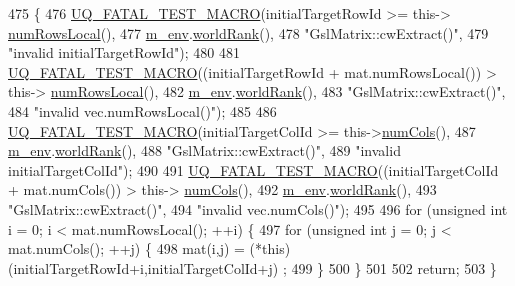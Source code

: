 \begin{DoxyCode}
475 \{
476   \hyperlink{_defines_8h_a56d63d18d0a6d45757de47fcc06f574d}{UQ\_FATAL\_TEST\_MACRO}(initialTargetRowId >= this->
      \hyperlink{class_q_u_e_s_o_1_1_gsl_matrix_ab5ec937a9fd439eef1a87e12c0dbccb4}{numRowsLocal}(),
477                       \hyperlink{class_q_u_e_s_o_1_1_matrix_a247fb0fc0b87fecdee054bb4660b68e8}{m\_env}.\hyperlink{class_q_u_e_s_o_1_1_base_environment_a78b57112bbd0e6dd0e8afec00b40ffa7}{worldRank}(),
478                       \textcolor{stringliteral}{"GslMatrix::cwExtract()"},
479                       \textcolor{stringliteral}{"invalid initialTargetRowId"});
480 
481   \hyperlink{_defines_8h_a56d63d18d0a6d45757de47fcc06f574d}{UQ\_FATAL\_TEST\_MACRO}((initialTargetRowId + mat.numRowsLocal()) > this->
      \hyperlink{class_q_u_e_s_o_1_1_gsl_matrix_ab5ec937a9fd439eef1a87e12c0dbccb4}{numRowsLocal}(),
482                       \hyperlink{class_q_u_e_s_o_1_1_matrix_a247fb0fc0b87fecdee054bb4660b68e8}{m\_env}.\hyperlink{class_q_u_e_s_o_1_1_base_environment_a78b57112bbd0e6dd0e8afec00b40ffa7}{worldRank}(),
483                       \textcolor{stringliteral}{"GslMatrix::cwExtract()"},
484                       \textcolor{stringliteral}{"invalid vec.numRowsLocal()"});
485 
486   \hyperlink{_defines_8h_a56d63d18d0a6d45757de47fcc06f574d}{UQ\_FATAL\_TEST\_MACRO}(initialTargetColId >= this->\hyperlink{class_q_u_e_s_o_1_1_gsl_matrix_ad5005f168fe030468e834776afb1859b}{numCols}(),
487                       \hyperlink{class_q_u_e_s_o_1_1_matrix_a247fb0fc0b87fecdee054bb4660b68e8}{m\_env}.\hyperlink{class_q_u_e_s_o_1_1_base_environment_a78b57112bbd0e6dd0e8afec00b40ffa7}{worldRank}(),
488                       \textcolor{stringliteral}{"GslMatrix::cwExtract()"},
489                       \textcolor{stringliteral}{"invalid initialTargetColId"});
490 
491   \hyperlink{_defines_8h_a56d63d18d0a6d45757de47fcc06f574d}{UQ\_FATAL\_TEST\_MACRO}((initialTargetColId + mat.numCols()) > this->
      \hyperlink{class_q_u_e_s_o_1_1_gsl_matrix_ad5005f168fe030468e834776afb1859b}{numCols}(),
492                       \hyperlink{class_q_u_e_s_o_1_1_matrix_a247fb0fc0b87fecdee054bb4660b68e8}{m\_env}.\hyperlink{class_q_u_e_s_o_1_1_base_environment_a78b57112bbd0e6dd0e8afec00b40ffa7}{worldRank}(),
493                       \textcolor{stringliteral}{"GslMatrix::cwExtract()"},
494                       \textcolor{stringliteral}{"invalid vec.numCols()"});
495 
496   \textcolor{keywordflow}{for} (\textcolor{keywordtype}{unsigned} \textcolor{keywordtype}{int} i = 0; i < mat.numRowsLocal(); ++i) \{
497     \textcolor{keywordflow}{for} (\textcolor{keywordtype}{unsigned} \textcolor{keywordtype}{int} j = 0; j < mat.numCols(); ++j) \{
498       mat(i,j) = (*this)(initialTargetRowId+i,initialTargetColId+j) ;
499     \}
500   \}
501 
502   \textcolor{keywordflow}{return};
503 \}
\end{DoxyCode}
